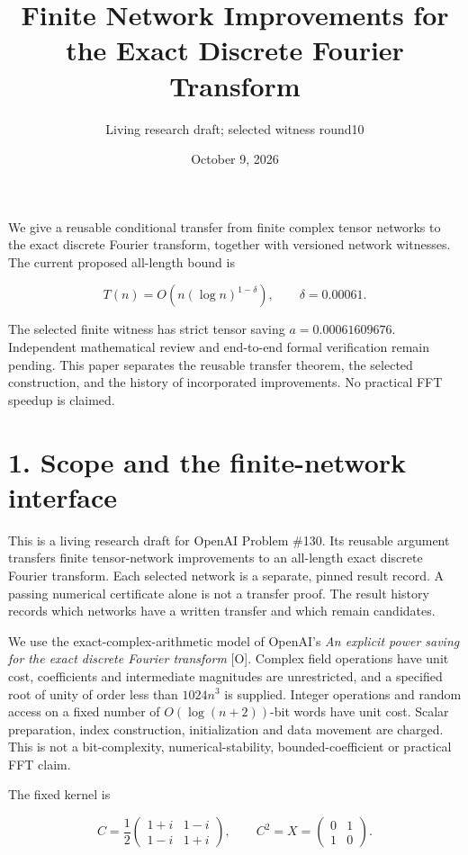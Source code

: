 \documentclass[
  11pt,
]{article}
\title{Finite Network Improvements for the Exact Discrete Fourier
Transform}
\subtitle{Living research draft; selected witness round10}
\author{}
\date{October 9, 2026}
\begin{document}
\maketitle

We give a reusable conditional transfer from finite complex tensor
networks to the exact discrete Fourier transform, together with
versioned network witnesses. The current proposed all-length bound is

\[
\boxed{T(n)=O\!\left(n(\log n)^{1-\delta}\right),\qquad
\delta=0.00061.}
\]

The selected finite witness has strict tensor saving
\(a=0.00061609676\). Independent mathematical review and end-to-end
formal verification remain pending. This paper separates the reusable
transfer theorem, the selected construction, and the history of
incorporated improvements. No practical FFT speedup is claimed.

\section{1. Scope and the finite-network
interface}\label{scope-and-the-finite-network-interface}

This is a living research draft for OpenAI Problem \#130. Its reusable
argument transfers finite tensor-network improvements to an all-length
exact discrete Fourier transform. Each selected network is a separate,
pinned result record. A passing numerical certificate alone is not a
transfer proof. The result history records which networks have a written
transfer and which remain candidates.

We use the exact-complex-arithmetic model of OpenAI's \emph{An explicit
power saving for the exact discrete Fourier transform} {[}O{]}. Complex
field operations have unit cost, coefficients and intermediate
magnitudes are unrestricted, and a specified root of unity of order less
than \(1024n^3\) is supplied. Integer operations and random access on a
fixed number of \(O(\log(n+2))\)-bit words have unit cost. Scalar
preparation, index construction, initialization and data movement are
charged. This is not a bit-complexity, numerical-stability,
bounded-coefficient or practical FFT claim.

The fixed kernel is

\[
C=\frac12\begin{pmatrix}1+i&1-i\\1-i&1+i\end{pmatrix},
\qquad C^2=X=\begin{pmatrix}0&1\\1&0\end{pmatrix}.
\]
\end{document}
